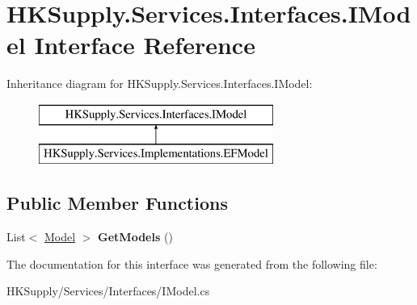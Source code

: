 \hypertarget{interface_h_k_supply_1_1_services_1_1_interfaces_1_1_i_model}{}\section{H\+K\+Supply.\+Services.\+Interfaces.\+I\+Model Interface Reference}
\label{interface_h_k_supply_1_1_services_1_1_interfaces_1_1_i_model}
Inheritance diagram for H\+K\+Supply.\+Services.\+Interfaces.\+I\+Model\+:\begin{figure}[H]
\begin{center}
\leavevmode
\includegraphics[height=2.000000cm]{interface_h_k_supply_1_1_services_1_1_interfaces_1_1_i_model}
\end{center}
\end{figure}
\subsection*{Public Member Functions}
\begin{DoxyCompactItemize}
\item 
\mbox{\label{interface_h_k_supply_1_1_services_1_1_interfaces_1_1_i_model_aac979c04b2d02050e754c95f938957c4}} 
List$<$ \mbox{\hyperlink{class_h_k_supply_1_1_models_1_1_model}{Model}} $>$ {\bfseries Get\+Models} ()
\end{DoxyCompactItemize}


The documentation for this interface was generated from the following file\+:\begin{DoxyCompactItemize}
\item 
H\+K\+Supply/\+Services/\+Interfaces/I\+Model.\+cs\end{DoxyCompactItemize}
